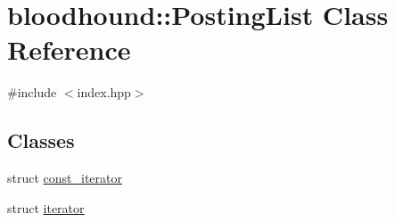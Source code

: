 \hypertarget{classbloodhound_1_1PostingList}{}\section{bloodhound\+:\+:Posting\+List Class Reference}
\label{classbloodhound_1_1PostingList}


{\ttfamily \#include $<$index.\+hpp$>$}

\subsection*{Classes}
\begin{DoxyCompactItemize}
\item 
struct \hyperlink{structbloodhound_1_1PostingList_1_1const__iterator}{const\+\_\+iterator}
\item 
struct \hyperlink{structbloodhound_1_1PostingList_1_1iterator}{iterator}
\end{DoxyCompactItemize}
